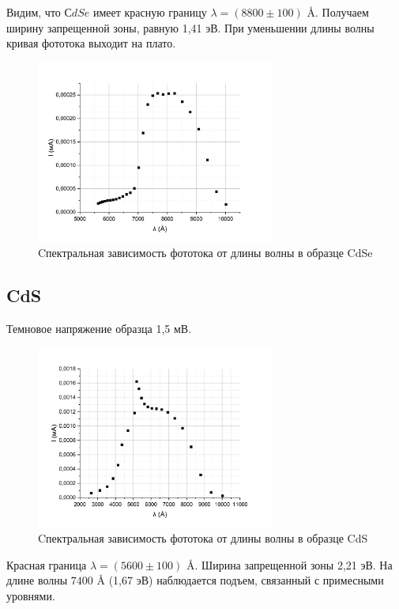 \documentclass[a4paper,12pt]{article} %
\begin{document}
Видим, что $СdSe$ имеет красную границу $\lambda = (8800 \pm 100)\text{ \AA}$. Получаем ширину запрещенной зоны, равную 1,41 эВ. При уменьшении длины волны кривая фототока выходит на плато. 

\begin{figure}[h!]
		\centering		\includegraphics[width=0.7\textwidth]{CdSe.png}
		\caption{Cпектральная зависимость фототока от длины волны в образце CdSe}
		\label{pic:CdSe}
	\end{figure}
	

\subsection{CdS}
Темновое напряжение образца 1,5 мВ.

\begin{figure}[h!]
		\centering		\includegraphics[width=0.7\textwidth]{CdS.png}
		\caption{Cпектральная зависимость фототока от длины волны в образце CdS}
		\label{pic:CdS}
	\end{figure}

Красная граница $\lambda = (5600 \pm 100)\text{ \AA}$. Ширина запрещенной зоны 2,21 эВ. На длине волны $7400\text{ \AA}$ (1,67 эВ) наблюдается подъем, связанный с примесными уровнями. 
\end{document}
